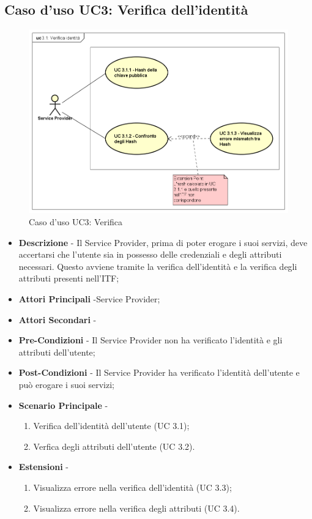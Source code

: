 \subsection{Caso d'uso UC3: Verifica dell'identità}
\begin{figure}[h]
	\centering
	\includegraphics[scale=0.50]{immagini/usecase/UC31_VerificaIdentita}
	\caption{Caso d'uso UC3: Verifica}
\end{figure}
\begin{itemize}
	\item \textbf{Descrizione} - Il Service Provider, prima di poter erogare i suoi servizi, deve accertarsi che l'utente sia in possesso delle credenziali e degli attributi necessari. Questo avviene tramite la verifica dell'identità e la verifica degli attributi presenti nell'\gls{ITF};
	\item \textbf{Attori Principali} -Service Provider;
	\item \textbf{Attori Secondari} -
	\item \textbf{Pre-Condizioni} - Il Service Provider non ha verificato l'identità e gli attributi dell'utente;
	\item \textbf{Post-Condizioni} - Il Service Provider ha verificato l'identità dell'utente e può erogare i suoi servizi;
	\item \textbf{Scenario Principale} -
	\begin{enumerate}
		\item Verifica dell'identità dell'utente (UC 3.1);
		\item Verfica degli attributi dell'utente (UC 3.2).
	\end{enumerate}
	\item \textbf{Estensioni} -
	\begin{enumerate}
		\item Visualizza errore nella verifica dell'identità (UC 3.3);
		\item Visualizza errore nella verifica degli attributi (UC 3.4).
	\end{enumerate}
\end{itemize}
